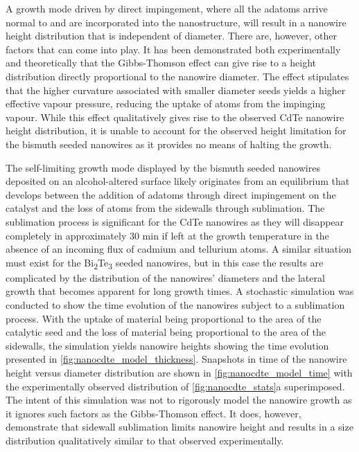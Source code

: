 A growth mode driven by direct impingement, where all
the adatoms arrive normal to and are incorporated into the
nanostructure, will result in a nanowire height distribution
that is independent of diameter. There are, however, other
factors that can come into play. It has been demonstrated
both experimentally\cite{Schubert2004a,Wu2002} and theoretically\cite{Kashchiev2006,Chen2006} that the
Gibbs-Thomson effect can give rise to a height distribution
directly proportional to the nanowire diameter. The effect
stipulates that the higher curvature associated with smaller
diameter seeds yields a higher effective vapour pressure,
reducing the uptake of atoms from the impinging vapour.
While this effect qualitatively gives rise to the observed CdTe
nanowire height distribution, it is unable to account for the
observed height limitation for the bismuth seeded nanowires
as it provides no means of halting the growth.

The self-limiting growth mode displayed by the bismuth
seeded nanowires deposited on an alcohol-altered surface
likely originates from an equilibrium that develops between the
addition of adatoms through direct impingement on the catalyst
and the loss of atoms from the sidewalls through sublimation.
The sublimation process is significant for the CdTe nanowires
as they will disappear completely in approximately 30 min if
left at the growth temperature in the absence of an incoming
flux of cadmium and tellurium atoms. A similar situation must
exist for the Bi\textsubscript{2}Te\textsubscript{3} seeded nanowires, but in this case the results are complicated by the distribution of the nanowires'
diameters and the lateral growth that becomes apparent for
long growth times. A stochastic simulation was conducted
to show the time evolution of the nanowires subject to a
sublimation process. With the uptake of material being
proportional to the area of the catalytic seed and the loss of
material being proportional to the area of the sidewalls, the
simulation yields nanowire heights showing the time evolution
presented in \cref{fig:nanocdte_model_thickness}. Snapshots in time of the nanowire
height versus diameter distribution are shown in \cref{fig:nanocdte_model_time}
with the experimentally observed distribution of \cref{fig:nanocdte_stats}a
superimposed. The intent of this simulation was not to
rigorously model the nanowire growth as it ignores such factors
as the Gibbs-Thomson effect. It does, however, demonstrate
that sidewall sublimation limits nanowire height and results
in a size distribution qualitatively similar to that observed
experimentally.

